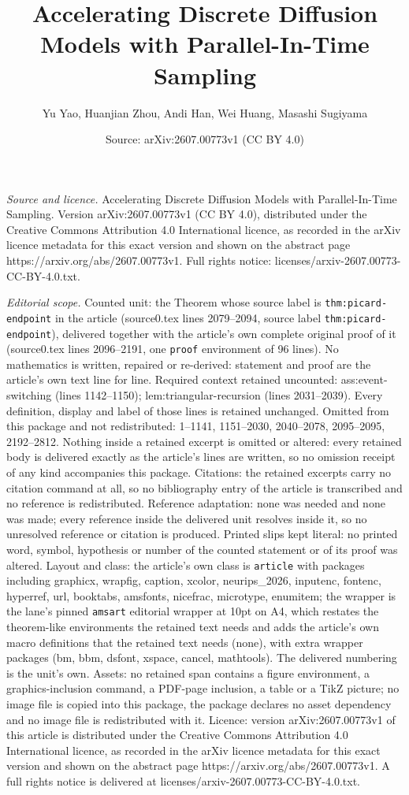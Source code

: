 \documentclass[10pt,a4paper]{amsart}
\title[Accelerating Discrete Diffusion Models with Parallel-In-Time]{Accelerating Discrete Diffusion Models with Parallel-In-Time Sampling}
\author{Yu Yao, Huanjian Zhou, Andi Han, Wei Huang, Masashi Sugiyama}
\date{Source: arXiv:2607.00773v1 (CC BY 4.0)}
\begin{document}
\maketitle

\noindent\emph{Source and licence.} Accelerating Discrete Diffusion Models with Parallel-In-Time Sampling. Version arXiv:2607.00773v1 (CC BY 4.0), distributed under the Creative Commons Attribution 4.0 International licence, as recorded in the arXiv licence metadata for this exact version and shown on the abstract page https://arxiv.org/abs/2607.00773v1. Full rights notice: licenses/arxiv-2607.00773-CC-BY-4.0.txt.\par\smallskip

\noindent\textit{Editorial scope.} Counted unit: the Theorem whose source label is \texttt{thm:picard-endpoint} in the article (source0.tex lines 2079--2094, source label \texttt{thm:picard-endpoint}), delivered together with the article's own complete original proof of it (source0.tex lines 2096--2191, one \texttt{proof} environment of 96 lines). No mathematics is written, repaired or re-derived: statement and proof are the article's own text line for line. Required context retained uncounted: ass:event-switching (lines 1142--1150); lem:triangular-recursion (lines 2031--2039). Every definition, display and label of those lines is retained unchanged. Omitted from this package and not redistributed: 1--1141, 1151--2030, 2040--2078, 2095--2095, 2192--2812. Nothing inside a retained excerpt is omitted or altered: every retained body is delivered exactly as the article's lines are written, so no omission receipt of any kind accompanies this package. Citations: the retained excerpts carry no citation command at all, so no bibliography entry of the article is transcribed and no reference is redistributed. Reference adaptation: none was needed and none was made; every reference inside the delivered unit resolves inside it, so no unresolved reference or citation is produced. Printed slips kept literal: no printed word, symbol, hypothesis or number of the counted statement or of its proof was altered. Layout and class: the article's own class is \texttt{article} with packages including graphicx, wrapfig, caption, xcolor, neurips\_2026, inputenc, fontenc, hyperref, url, booktabs, amsfonts, nicefrac, microtype, enumitem; the wrapper is the lane's pinned \texttt{amsart} editorial wrapper at 10pt on A4, which restates the theorem-like environments the retained text needs and adds the article's own macro definitions that the retained text needs (none), with extra wrapper packages (bm, bbm, dsfont, xspace, cancel, mathtools). The delivered numbering is the unit's own. Assets: no retained span contains a figure environment, a graphics-inclusion command, a PDF-page inclusion, a table or a TikZ picture; no image file is copied into this package, the package declares no asset dependency and no image file is redistributed with it. Licence: version arXiv:2607.00773v1 of this article is distributed under the Creative Commons Attribution 4.0 International licence, as recorded in the arXiv licence metadata for this exact version and shown on the abstract page https://arxiv.org/abs/2607.00773v1. A full rights notice is delivered at licenses/arxiv-2607.00773-CC-BY-4.0.txt. 
\end{document}
